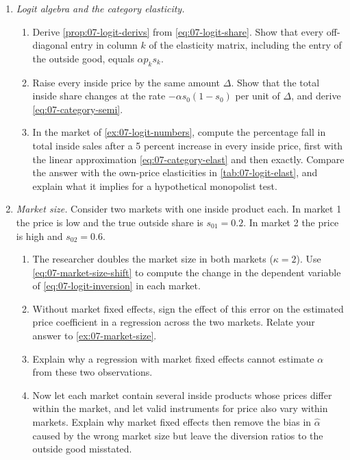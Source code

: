 \begin{enumerate}[label=\arabic*., leftmargin=*, itemsep=6pt]

\item \emph{Logit algebra and the category elasticity.}
\begin{enumerate}[label=(\alph*)]
  \item Derive \cref{prop:07-logit-derivs} from \eqref{eq:07-logit-share}. Show that every off-diagonal entry in
  column $k$ of the elasticity matrix, including the entry of the outside good, equals $\alpha p_k s_k$.
  \item Raise every inside price by the same amount $\Delta$. Show that the total inside share changes at the
  rate $-\alpha s_0(1 - s_0)$ per unit of $\Delta$, and derive \eqref{eq:07-category-semi}.
  \item In the market of \cref{ex:07-logit-numbers}, compute the percentage fall in total inside sales after a
  5 percent increase in every inside price, first with the linear approximation \eqref{eq:07-category-elast} and
  then exactly. Compare the answer with the own-price elasticities in \cref{tab:07-logit-elast}, and explain what
  it implies for a hypothetical monopolist test.
\end{enumerate}

\item \emph{Market size.} Consider two markets with one inside product each. In market 1 the price is low and the
true outside share is $s_{01} = 0.2$. In market 2 the price is high and $s_{02} = 0.6$.
\begin{enumerate}[label=(\alph*)]
  \item The researcher doubles the market size in both markets ($\kappa = 2$). Use \eqref{eq:07-market-size-shift}
  to compute the change in the dependent variable of \eqref{eq:07-logit-inversion} in each market.
  \item Without market fixed effects, sign the effect of this error on the estimated price coefficient in a
  regression across the two markets. Relate your answer to \cref{ex:07-market-size}.
  \item Explain why a regression with market fixed effects cannot estimate $\alpha$ from these two observations.
  \item Now let each market contain several inside products whose prices differ within the market, and let valid
  instruments for price also vary within markets. Explain why market fixed effects then remove the bias in
  $\hat\alpha$ caused by the wrong market size but leave the diversion ratios to the outside good misstated.
\end{enumerate}


\end{enumerate}
